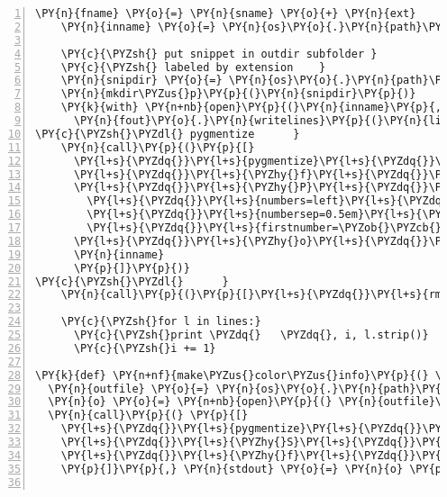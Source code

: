 \begin{Verbatim}[commandchars=\\\{\},numbers=left,numbersep=0.5em]
    \PY{n}{fname} \PY{o}{=} \PY{n}{sname} \PY{o}{+} \PY{n}{ext}
    \PY{n}{inname} \PY{o}{=} \PY{n}{os}\PY{o}{.}\PY{n}{path}\PY{o}{.}\PY{n}{join}\PY{p}{(}\PY{n}{outdir}\PY{p}{,} \PY{n}{fname}\PY{p}{)}
    
    \PY{c}{\PYZsh{} put snippet in outdir subfolder }
    \PY{c}{\PYZsh{} labeled by extension    }
    \PY{n}{snipdir} \PY{o}{=} \PY{n}{os}\PY{o}{.}\PY{n}{path}\PY{o}{.}\PY{n}{join}\PY{p}{(}\PY{n}{outdir}\PY{p}{,}\PY{n}{ext}\PY{p}{[}\PY{l+m+mi}{1}\PY{p}{:}\PY{p}{]}\PY{p}{)}
    \PY{n}{mkdir\PYZus{}p}\PY{p}{(}\PY{n}{snipdir}\PY{p}{)}
    \PY{k}{with} \PY{n+nb}{open}\PY{p}{(}\PY{n}{inname}\PY{p}{,} \PY{l+s}{\PYZdq{}}\PY{l+s}{w}\PY{l+s}{\PYZdq{}}\PY{p}{)} \PY{k}{as} \PY{n}{fout}\PY{p}{:}
      \PY{n}{fout}\PY{o}{.}\PY{n}{writelines}\PY{p}{(}\PY{n}{lines}\PY{p}{)}
\PY{c}{\PYZsh{}\PYZdl{} pygmentize      }
    \PY{n}{call}\PY{p}{(}\PY{p}{[}
      \PY{l+s}{\PYZdq{}}\PY{l+s}{pygmentize}\PY{l+s}{\PYZdq{}}\PY{p}{,} 
      \PY{l+s}{\PYZdq{}}\PY{l+s}{\PYZhy{}f}\PY{l+s}{\PYZdq{}}\PY{p}{,} \PY{l+s}{\PYZdq{}}\PY{l+s}{tex}\PY{l+s}{\PYZdq{}}\PY{p}{,} 
      \PY{l+s}{\PYZdq{}}\PY{l+s}{\PYZhy{}P}\PY{l+s}{\PYZdq{}}\PY{p}{,} \PY{l+s}{\PYZdq{}}\PY{l+s}{verboptions=\PYZob{}\PYZcb{},\PYZob{}\PYZcb{},\PYZob{}\PYZcb{}}\PY{l+s}{\PYZdq{}}\PY{o}{.}\PY{n}{format}\PY{p}{(}
        \PY{l+s}{\PYZdq{}}\PY{l+s}{numbers=left}\PY{l+s}{\PYZdq{}}\PY{p}{,} 
        \PY{l+s}{\PYZdq{}}\PY{l+s}{numbersep=0.5em}\PY{l+s}{\PYZdq{}}\PY{p}{,}
        \PY{l+s}{\PYZdq{}}\PY{l+s}{firstnumber=\PYZob{}\PYZcb{}}\PY{l+s}{\PYZdq{}}\PY{o}{.}\PY{n}{format}\PY{p}{(}\PY{n}{i}\PY{p}{)}\PY{p}{)}\PY{p}{,}
      \PY{l+s}{\PYZdq{}}\PY{l+s}{\PYZhy{}o}\PY{l+s}{\PYZdq{}}\PY{p}{,} \PY{n}{os}\PY{o}{.}\PY{n}{path}\PY{o}{.}\PY{n}{join}\PY{p}{(}\PY{n}{snipdir}\PY{p}{,} \PY{n}{sname} \PY{o}{+} \PY{l+s}{\PYZdq{}}\PY{l+s}{.tex}\PY{l+s}{\PYZdq{}}\PY{p}{)}\PY{p}{,}
      \PY{n}{inname}
      \PY{p}{]}\PY{p}{)}
\PY{c}{\PYZsh{}\PYZdl{}      }
    \PY{n}{call}\PY{p}{(}\PY{p}{[}\PY{l+s}{\PYZdq{}}\PY{l+s}{rm}\PY{l+s}{\PYZdq{}}\PY{p}{,} \PY{n}{inname}\PY{p}{]}\PY{p}{)}
    
    \PY{c}{\PYZsh{}for l in lines:}
      \PY{c}{\PYZsh{}print \PYZdq{}   \PYZdq{}, i, l.strip()}
      \PY{c}{\PYZsh{}i += 1}
      
\PY{k}{def} \PY{n+nf}{make\PYZus{}color\PYZus{}info}\PY{p}{(} \PY{n}{outdir}\PY{p}{,} \PY{n}{style} \PY{p}{)}\PY{p}{:}
  \PY{n}{outfile} \PY{o}{=} \PY{n}{os}\PY{o}{.}\PY{n}{path}\PY{o}{.}\PY{n}{join}\PY{p}{(}\PY{n}{outdir}\PY{p}{,}\PY{l+s}{\PYZdq{}}\PY{l+s}{color\PYZus{}info.tex}\PY{l+s}{\PYZdq{}}\PY{p}{)}
  \PY{n}{o} \PY{o}{=} \PY{n+nb}{open}\PY{p}{(} \PY{n}{outfile}\PY{p}{,} \PY{l+s}{\PYZdq{}}\PY{l+s}{w}\PY{l+s}{\PYZdq{}} \PY{p}{)}
  \PY{n}{call}\PY{p}{(} \PY{p}{[}
    \PY{l+s}{\PYZdq{}}\PY{l+s}{pygmentize}\PY{l+s}{\PYZdq{}}\PY{p}{,}
    \PY{l+s}{\PYZdq{}}\PY{l+s}{\PYZhy{}S}\PY{l+s}{\PYZdq{}}\PY{p}{,} \PY{n}{style}\PY{p}{,}
    \PY{l+s}{\PYZdq{}}\PY{l+s}{\PYZhy{}f}\PY{l+s}{\PYZdq{}}\PY{p}{,} \PY{l+s}{\PYZdq{}}\PY{l+s}{latex}\PY{l+s}{\PYZdq{}}
    \PY{p}{]}\PY{p}{,} \PY{n}{stdout} \PY{o}{=} \PY{n}{o} \PY{p}{)}
  

\end{Verbatim}
